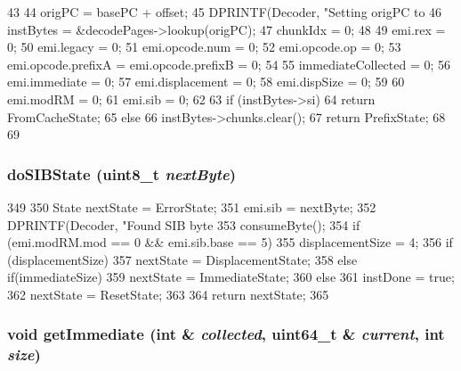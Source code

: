 \begin{DoxyCode}
43 {
44     origPC = basePC + offset;
45     DPRINTF(Decoder, "Setting origPC to %
46     instBytes = &decodePages->lookup(origPC);
47     chunkIdx = 0;
48 
49     emi.rex = 0;
50     emi.legacy = 0;
51     emi.opcode.num = 0;
52     emi.opcode.op = 0;
53     emi.opcode.prefixA = emi.opcode.prefixB = 0;
54 
55     immediateCollected = 0;
56     emi.immediate = 0;
57     emi.displacement = 0;
58     emi.dispSize = 0;
59 
60     emi.modRM = 0;
61     emi.sib = 0;
62 
63     if (instBytes->si) {
64         return FromCacheState;
65     } else {
66         instBytes->chunks.clear();
67         return PrefixState;
68     }
69 }
\end{DoxyCode}
\hypertarget{classX86ISA_1_1Decoder_a429d36cbff305b40608c013c0c6a15b1}{
\subsubsection[{doSIBState}]{ doSIBState (uint8\_\-t {\em nextByte})}}
\label{classX86ISA_1_1Decoder_a429d36cbff305b40608c013c0c6a15b1}



\begin{DoxyCode}
349 {
350     State nextState = ErrorState;
351     emi.sib = nextByte;
352     DPRINTF(Decoder, "Found SIB byte %
353     consumeByte();
354     if (emi.modRM.mod == 0 && emi.sib.base == 5)
355         displacementSize = 4;
356     if (displacementSize) {
357         nextState = DisplacementState;
358     } else if(immediateSize) {
359         nextState = ImmediateState;
360     } else {
361         instDone = true;
362         nextState = ResetState;
363     }
364     return nextState;
365 }
\end{DoxyCode}
\hypertarget{classX86ISA_1_1Decoder_aca8cee2ca4f61924adea583f466e5c27}{
\subsubsection[{getImmediate}]{\setlength{\rightskip}{0pt plus 5cm}void getImmediate (int \& {\em collected}, \/  uint64\_\-t \& {\em current}, \/  int {\em size})}}
\label{classX86ISA_1_1Decoder_aca8cee2ca4f61924adea583f466e5c27}



